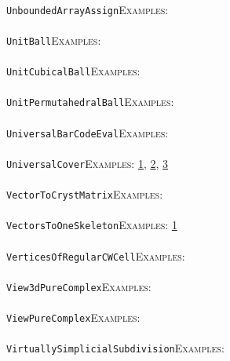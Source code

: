 \documentclass[a4paper,11pt]{report}
\begin{document}
{{ \\
 \texttt{UnboundedArrayAssign}{\nobreakspace}{\nobreakspace}{\nobreakspace}{\nobreakspace}\textsc{Examples:} \\
 \\
 \texttt{UnitBall}{\nobreakspace}{\nobreakspace}{\nobreakspace}{\nobreakspace}\textsc{Examples:} \\
 \\
 \texttt{UnitCubicalBall}{\nobreakspace}{\nobreakspace}{\nobreakspace}{\nobreakspace}\textsc{Examples:} \\
 \\
 \texttt{UnitPermutahedralBall}{\nobreakspace}{\nobreakspace}{\nobreakspace}{\nobreakspace}\textsc{Examples:} \\
 \\
 \texttt{UniversalBarCodeEval}{\nobreakspace}{\nobreakspace}{\nobreakspace}{\nobreakspace}\textsc{Examples:} \\
 \\
 \texttt{UniversalCover}{\nobreakspace}{\nobreakspace}{\nobreakspace}{\nobreakspace}\textsc{Examples:} \href{tutorial/chap3.html} {1}{\nobreakspace}, \href{../www/SideLinks/About/aboutCoveringSpaces.html} {2}{\nobreakspace}, \href{../www/SideLinks/About/aboutCoverinSpaces.html} {3}{\nobreakspace} \\
 \\
 \texttt{VectorToCrystMatrix}{\nobreakspace}{\nobreakspace}{\nobreakspace}{\nobreakspace}\textsc{Examples:} \\
 \\
 \texttt{VectorsToOneSkeleton}{\nobreakspace}{\nobreakspace}{\nobreakspace}{\nobreakspace}\textsc{Examples:} \href{tutorial/chap4.html} {1}{\nobreakspace} \\
 \\
 \texttt{VerticesOfRegularCWCell}{\nobreakspace}{\nobreakspace}{\nobreakspace}{\nobreakspace}\textsc{Examples:} \\
 \\
 \texttt{View3dPureComplex}{\nobreakspace}{\nobreakspace}{\nobreakspace}{\nobreakspace}\textsc{Examples:} \\
 \\
 \texttt{ViewPureComplex}{\nobreakspace}{\nobreakspace}{\nobreakspace}{\nobreakspace}\textsc{Examples:} \\
 \\
 \texttt{VirtuallySimplicialSubdivision}{\nobreakspace}{\nobreakspace}{\nobreakspace}{\nobreakspace}\textsc{Examples:} \\
 \\
}}
\end{document}
